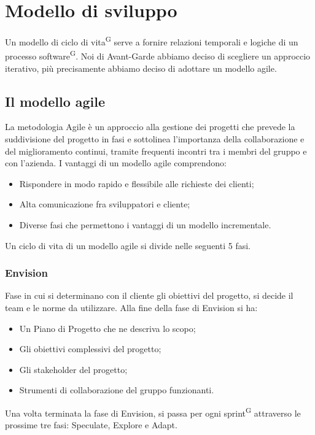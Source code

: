 \newpage
\section{Modello di sviluppo}\label{sec:modello_sviluppo}
Un modello di ciclo di vita\textsuperscript{G} serve a fornire relazioni temporali e logiche di un processo software\textsuperscript{G}.
Noi di Avant-Garde abbiamo deciso di scegliere un approccio iterativo, più precisamente abbiamo deciso di adottare un modello agile.

\subsection{Il modello agile}\label{sec:modello_sviluppo:agile}
La metodologia Agile è un approccio alla gestione dei progetti che prevede la suddivisione del progetto in fasi e sottolinea l'importanza della collaborazione e del miglioramento continui, tramite frequenti incontri tra i membri del gruppo e con l'azienda.
I vantaggi di un modello agile comprendono:
\begin{itemize}
    \item Rispondere in modo rapido e flessibile alle richieste dei clienti;
    \item Alta comunicazione fra sviluppatori e cliente;
    \item Diverse fasi che permettono i vantaggi di un modello incrementale.
\end{itemize}
Un ciclo di vita di un modello agile si divide nelle seguenti 5 fasi.
    \subsubsection{Envision}\label{sec:modello_sviluppo:agile:envision}
    Fase in cui si determinano con il cliente gli obiettivi del progetto, si decide il team e le norme da utilizzare.
    Alla fine della fase di Envision si ha:
    \begin{itemize}
        \item Un Piano di Progetto che ne descriva lo scopo;
        \item Gli obiettivi complessivi del progetto;
        \item Gli stakeholder del progetto;
        \item Strumenti di collaborazione del gruppo funzionanti.
    \end{itemize}
    Una volta terminata la fase di Envision, si passa per ogni sprint\textsuperscript{G} attraverso le prossime tre fasi: Speculate, Explore e Adapt.
